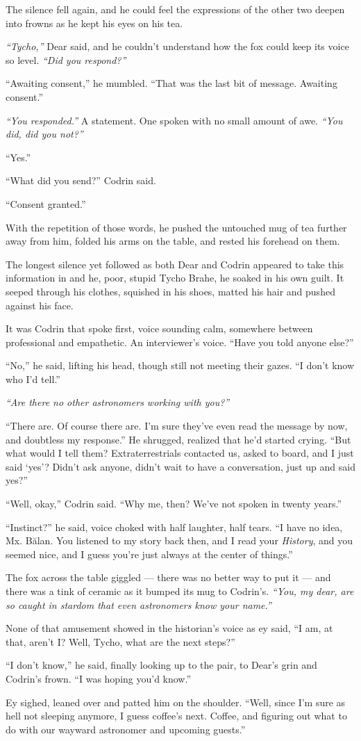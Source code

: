 The silence fell again, and he could feel the expressions of the other two deepen into frowns as he kept his eyes on his tea.

\emph{``Tycho,''} Dear said, and he couldn't understand how the fox could keep its voice so level. \emph{``Did you respond?''}

``Awaiting consent,'' he mumbled. ``That was the last bit of message. Awaiting consent.''

\emph{``You responded.''} A statement. One spoken with no small amount of awe. \emph{``You did, did you not?''}

``Yes.''

``What did you send?'' Codrin said.

``Consent granted.''

With the repetition of those words, he pushed the untouched mug of tea further away from him, folded his arms on the table, and rested his forehead on them.

The longest silence yet followed as both Dear and Codrin appeared to take this information in and he, poor, stupid Tycho Brahe, he soaked in his own guilt. It seeped through his clothes, squished in his shoes, matted his hair and pushed against his face.

It was Codrin that spoke first, voice sounding calm, somewhere between professional and empathetic. An interviewer's voice. ``Have you told anyone else?''

``No,'' he said, lifting his head, though still not meeting their gazes. ``I don't know who I'd tell.''

\emph{``Are there no other astronomers working with you?''}

``There are. Of course there are. I'm sure they've even read the message by now, and doubtless my response.'' He shrugged, realized that he'd started crying. ``But what would I tell them? Extraterrestrials contacted us, asked to board, and I just said `yes'? Didn't ask anyone, didn't wait to have a conversation, just up and said yes?''

``Well, okay,'' Codrin said. ``Why me, then? We've not spoken in twenty years.''

``Instinct?'' he said, voice choked with half laughter, half tears. ``I have no idea, Mx. Bălan. You listened to my story back then, and I read your \emph{History}, and you seemed nice, and I guess you're just always at the center of things.''

The fox across the table giggled — there was no better way to put it — and there was a tink of ceramic as it bumped its mug to Codrin's. \emph{``You, my dear, are so caught in stardom that even astronomers know your name.''}

None of that amusement showed in the historian's voice as ey said, ``I am, at that, aren't I? Well, Tycho, what are the next steps?''

``I don't know,'' he said, finally looking up to the pair, to Dear's grin and Codrin's frown. ``I was hoping you'd know.''

Ey sighed, leaned over and patted him on the shoulder. ``Well, since I'm sure as hell not sleeping anymore, I guess coffee's next. Coffee, and figuring out what to do with our wayward astronomer and upcoming guests.''
